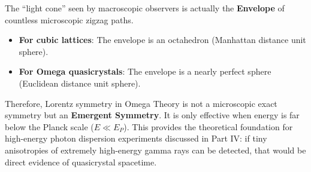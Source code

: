 The ``light cone'' seen by macroscopic observers is actually the \textbf{Envelope} of countless microscopic zigzag paths.

\begin{itemize}
\item \textbf{For cubic lattices}: The envelope is an octahedron (Manhattan distance unit sphere).
\item \textbf{For Omega quasicrystals}: The envelope is a nearly perfect sphere (Euclidean distance unit sphere).
\end{itemize}

Therefore, Lorentz symmetry in Omega Theory is not a microscopic exact symmetry but an \textbf{Emergent Symmetry}. It is only effective when energy is far below the Planck scale ($E \ll E_P$). This provides the theoretical foundation for high-energy photon dispersion experiments discussed in Part IV: if tiny anisotropies of extremely high-energy gamma rays can be detected, that would be direct evidence of quasicrystal spacetime.
